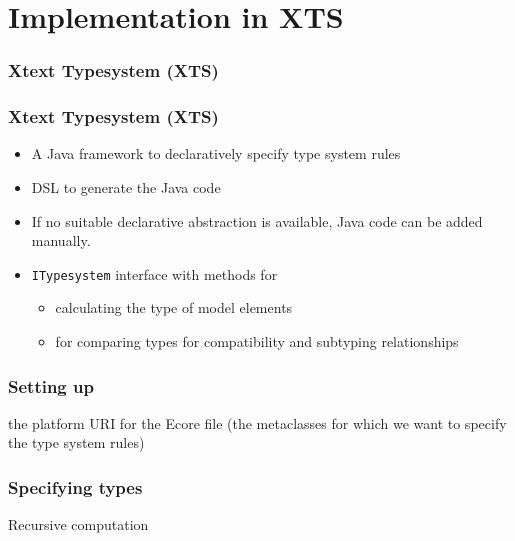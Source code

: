 \section[XTS]{Implementation in XTS}

\begin{frame}
  \frametitle{Xtext Typesystem (XTS)}
  \tableofcontents[currentsection]
\end{frame}

\begin{frame}
  \frametitle{Xtext Typesystem (XTS)}
  \begin{itemize}
  \item A Java framework to declaratively specify type system rules 
  \item DSL to generate the Java code
   \item If no suitable declarative abstraction is available, 
   Java code can be added manually.
   \item \texttt{ITypesystem} interface with methods for
   \begin{itemize}
	\item calculating the type of model elements
	\item for comparing types for
	compatibility and subtyping relationships
   \end{itemize}
\end{itemize}
\end{frame}

\begin{frame}[fragile]
  \frametitle{Setting up}


  \begin{footnotesize}
    
  \end{footnotesize}


the platform URI for the Ecore file (the metaclasses for
which we want to specify the type system rules)

\end{frame}

\begin{frame}[fragile]
  \frametitle{Specifying types}

  \begin{footnotesize}
    
  \end{footnotesize}


  \begin{footnotesize}
    
  \end{footnotesize}


\medskip

	Recursive computation

  \begin{footnotesize}
    
  \end{footnotesize}


\end{frame}

